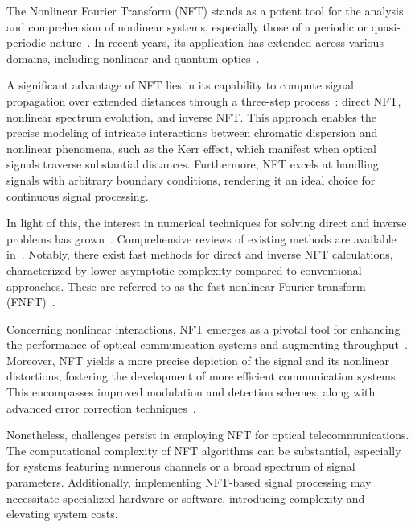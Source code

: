 The Nonlinear Fourier Transform (NFT) stands as a potent tool for the analysis and comprehension of nonlinear systems, especially those of a periodic or quasi-periodic nature~\cite{ZakharovShabat1972, Ablowitz1981, Kamalian2018}. In recent years, its application has extended across various domains, including nonlinear and quantum optics~\cite{Gelash2019PRL, Mullyadzhanov2019, Chekhovskoy2019_PRL}.

A significant advantage of NFT lies in its capability to compute signal propagation over extended distances through a three-step process~\cite{Yousefi2014I}: direct NFT, nonlinear spectrum evolution, and inverse NFT. This approach enables the precise modeling of intricate interactions between chromatic dispersion and nonlinear phenomena, such as the Kerr effect, which manifest when optical signals traverse substantial distances. Furthermore, NFT excels at handling signals with arbitrary boundary conditions, rendering it an ideal choice for continuous signal processing.

In light of this, the interest in numerical techniques for solving direct and inverse problems has grown~\cite{Boffetta1992a, Belai2006, Frumin2015_TIB, 10026447}. Comprehensive reviews of existing methods are available in~\cite{Yousefi2014II, Turitsyn2017Optica, Vasylchenkova2019a}. Notably, there exist fast methods for direct and inverse NFT calculations, characterized by lower asymptotic complexity compared to conventional approaches. These are referred to as the fast nonlinear Fourier transform (FNFT)~\cite{Wahls2013, Wahls2015, Wahls2015a, Wahls2016, Vaibhav2018, Wahls2018, Chimmalgi2019}.

Concerning nonlinear interactions, NFT emerges as a pivotal tool for enhancing the performance of optical communication systems and augmenting throughput~\cite{Kamalian2018, Turitsyn2017Optica, Le2014, Prilepsky2014, essiambre2012capacity, Civelli2019, Sedov:18}. Moreover, NFT yields a more precise depiction of the signal and its nonlinear distortions, fostering the development of more efficient communication systems. This encompasses improved modulation and detection schemes, along with advanced error correction techniques~\cite{Frumin2017, Gui2017a, Aref2018_JLT}.

Nonetheless, challenges persist in employing NFT for optical telecommunications. The computational complexity of NFT algorithms can be substantial, especially for systems featuring numerous channels or a broad spectrum of signal parameters. Additionally, implementing NFT-based signal processing may necessitate specialized hardware or software, introducing complexity and elevating system costs.

